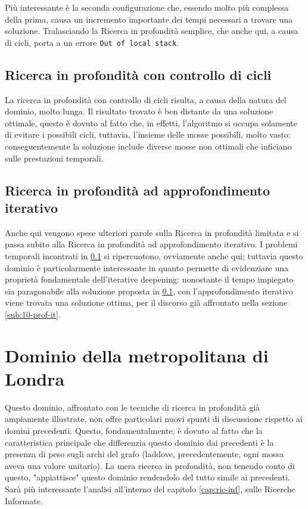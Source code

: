 Più interessante è la seconda configurazione che, essendo molto più complessa della prima, causa un incremento importante dei tempi necessari a trovare una soluzione. Tralasciando la Ricerca in profondità semplice, che anche qui, a causa di cicli, porta a un errore \texttt{Out of local stack}.

\subsection{Ricerca in profondità con controllo di cicli} \label{sub:blocchi-prof-cc}
La ricerca in profondità con controllo di cicli risulta, a causa della natura del dominio, molto lunga. Il risultato trovato è ben distante da una soluzione ottimale, questo è dovuto al fatto che, in effetti, l'algoritmo si occupa solamente di evitare i possibili cicli, tuttavia, l'insieme delle mosse possibili, molto vasto: conseguentemente la soluzione include diverse mosse non ottimali che inficiano sulle prestazioni temporali.

\subsection{Ricerca in profondità ad approfondimento iterativo}
Anche qui vengono spese ulteriori parole sulla Ricerca in profondità limitata e si passa subito alla Ricerca in profondità ad approfondimento iterativo. I problemi temporali incontrati in \ref{sub:blocchi-prof-cc} si ripercuotono, ovviamente anche qui; tuttavia questo dominio è particolarmente interessante in quanto permette di evidenziare una proprietà fondamentale dell'iterative deepening: nonostante il tempo impiegato sia paragonabile alla soluzione proposta in \ref{sub:blocchi-prof-cc}, con l'approfondimento iterativo viene trovata una soluzione ottima, per il discorso già affrontato nella sezione \ref{sub:10-prof-it}.

\section{Dominio della metropolitana di Londra}
Questo dominio, affrontato con le tecniche di ricerca in profondità già ampiamente illustrate, non offre particolari nuovi spunti di discussione rispetto ai domini precedenti. Questo, fondamentalmente, è dovuto al fatto che la caratteristica principale che differenzia questo dominio dai precedenti è la presenza di peso sugli archi del grafo (laddove, precedentemente, ogni mossa aveva una valore unitario). La mera ricerca in profondità, non tenendo conto di questo, "appiattisce" questo dominio rendendolo del tutto simile ai precedenti. Sarà più interessante l'analisi all'interno del capitolo \ref{cap:ric-inf}, sulle Ricerche Informate.
